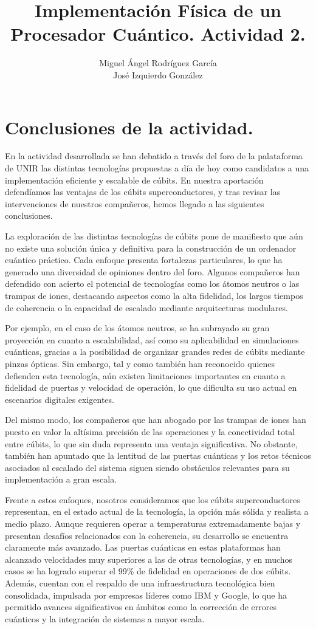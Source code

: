 \documentclass{article}
\title{Implementación Física de un Procesador Cuántico. Actividad 2.}
\author{Miguel Ángel Rodríguez García\\José Izquierdo González}
\date{}
\begin{document}
\maketitle

\section{Conclusiones de la actividad.}

En la actividad desarrollada se han debatido a través del foro de la palataforma de UNIR las distintas tecnologías propuestas a día de hoy como candidatos a una implementación eficiente y escalable de cúbits. En nuestra aportación defendíamos las ventajas de los cúbits superconductores, y tras revisar las intervenciones de nuestros compañeros, hemos llegado a las siguientes conclusiones.

La exploración de las distintas tecnologías de cúbits pone de manifiesto que aún no existe una solución única y definitiva para la construcción de un ordenador cuántico práctico. Cada enfoque presenta fortalezas particulares, lo que ha generado una diversidad de opiniones dentro del foro. Algunos compañeros han defendido con acierto el potencial de tecnologías como los átomos neutros o las trampas de iones, destacando aspectos como la alta fidelidad, los largos tiempos de coherencia o la capacidad de escalado mediante arquitecturas modulares.

Por ejemplo, en el caso de los átomos neutros, se ha subrayado su gran proyección en cuanto a escalabilidad, así como su aplicabilidad en simulaciones cuánticas, gracias a la posibilidad de organizar grandes redes de cúbits mediante pinzas ópticas. Sin embargo, tal y como también han reconocido quienes defienden esta tecnología, aún existen limitaciones importantes en cuanto a fidelidad de puertas y velocidad de operación, lo que dificulta su uso actual en escenarios digitales exigentes.

Del mismo modo, los compañeros que han abogado por las trampas de iones han puesto en valor la altísima precisión de las operaciones y la conectividad total entre cúbits, lo que sin duda representa una ventaja significativa. No obstante, también han apuntado que la lentitud de las puertas cuánticas y los retos técnicos asociados al escalado del sistema siguen siendo obstáculos relevantes para su implementación a gran escala.

Frente a estos enfoques, nosotros consideramos que los cúbits superconductores representan, en el estado actual de la tecnología, la opción más sólida y realista a medio plazo. Aunque requieren operar a temperaturas extremadamente bajas y presentan desafíos relacionados con la coherencia, su desarrollo se encuentra claramente más avanzado. Las puertas cuánticas en estas plataformas han alcanzado velocidades muy superiores a las de otras tecnologías, y en muchos casos se ha logrado superar el 99\% de fidelidad en operaciones de dos cúbits. Además, cuentan con el respaldo de una infraestructura tecnológica bien consolidada, impulsada por empresas líderes como IBM y Google, lo que ha permitido avances significativos en ámbitos como la corrección de errores cuánticos y la integración de sistemas a mayor escala.
\end{document}
